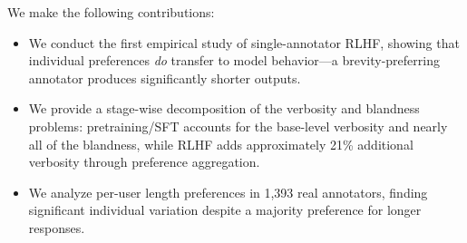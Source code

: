 We make the following contributions:
\begin{itemize}[leftmargin=*,itemsep=0pt,topsep=0pt]
    \item We conduct the first empirical study of single-annotator RLHF, showing that individual preferences \emph{do} transfer to model behavior---a brevity-preferring annotator produces significantly shorter outputs.
    \item We provide a stage-wise decomposition of the verbosity and blandness problems: pretraining/SFT accounts for the base-level verbosity and nearly all of the blandness, while RLHF adds approximately 21\% additional verbosity through preference aggregation.
    \item We analyze per-user length preferences in 1,393 real annotators, finding significant individual variation despite a majority preference for longer responses.
\end{itemize}
